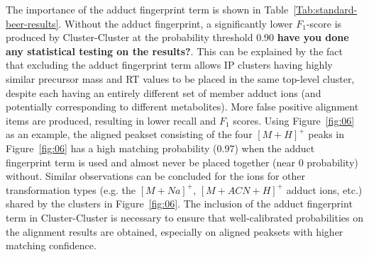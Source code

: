 The importance of the adduct fingerprint term is shown in Table~\ref{Tab:standard-beer-results}. Without the adduct fingerprint, a significantly lower $F_1$-score is produced by Cluster-Cluster at the probability threshold 0.90 \textbf{have you done any statistical testing on the results?}. This can be explained by the fact that excluding the adduct fingerprint term allows IP clusters having highly similar precursor mass and RT values to be placed in the same top-level cluster, despite each having an entirely different set of member adduct ions (and potentially corresponding to different metabolites). More false positive alignment items are produced, resulting in lower recall and $F_1$ scores. Using Figure~\ref{fig:06} as an example, the aligned peakset consisting of the four $[M+H]^+$ peaks in Figure~\ref{fig:06} has a high matching probability (0.97) when the adduct fingerprint term is used and almost never be placed together (near 0 probability) without. Similar observations can be concluded for the ions for other transformation types (e.g. the $[M+Na]^+$, $[M+ACN+H]^+$ adduct ions, etc.) shared by the clusters in Figure~\ref{fig:06}. The inclusion of the adduct fingerprint term in Cluster-Cluster is necessary to ensure that well-calibrated probabilities on the alignment results are obtained, especially on aligned peaksets with higher matching confidence.

